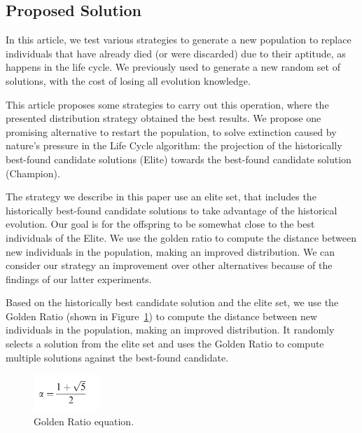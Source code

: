 \documentclass[graybox]{svmult}
\begin{document}
    \subsection{Proposed Solution}
        In this article, we test various strategies to generate a new population to
        replace individuals that have already died (or were discarded) due to their
        aptitude, as happens in the life cycle. We previously used to generate a new
        random set of solutions, with the cost of losing all evolution knowledge. 
        
        This article proposes some strategies to carry out this operation,
        where the presented distribution strategy obtained the best results. We
        propose one promising alternative to restart the population, to solve
        extinction caused by nature's pressure in the Life Cycle algorithm: the
        projection of the historically best-found candidate solutions (Elite)
        towards the best-found candidate solution (Champion).

        The strategy we describe in this paper use an elite set, that includes
        the historically best-found candidate solutions to take
        advantage of the historical evolution. Our goal is for the offspring to
        be somewhat close to the best individuals of the Elite.
        We use the golden ratio to compute the distance between new individuals in the population, making
        an improved distribution. We can consider our strategy an improvement 
        over other alternatives because of the findings of our latter experiments.

        Based on the historically best candidate
        solution and the elite set, we use the Golden Ratio (shown in
        Figure~\ref{fig.golden_ratio}) to compute the distance between new individuals
        in the population, making an improved distribution. It randomly selects a
        solution from the elite set and uses the Golden Ratio 
        \cite{nematollahi2020novel, gaikwad2021face, khesin2022golden, sym13081334, https://doi.org/10.1111/nyas.14895} 
        to compute multiple solutions against the best-found candidate.

        \begin{figure}
            \centering
            \includegraphics[width=25mm]{img/fig_golden_ratio.pdf}
            \caption{Golden Ratio equation.} \label{fig.golden_ratio}
            \end{figure}
\end{document}
